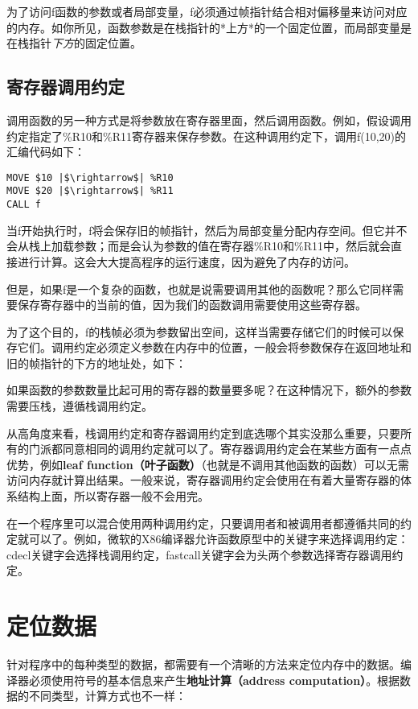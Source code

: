 \documentclass[cn,11pt,chinese]{elegantbook}
\begin{document}
为了访问f函数的参数或者局部变量，f必须通过帧指针结合相对偏移量来访问对应的内存。如你所见，函数参数是在栈指针的*上方*的一个固定位置，而局部变量是在栈指针\textit{下方}的固定位置。

\subsection{寄存器调用约定}

调用函数的另一种方式是将参数放在寄存器里面，然后调用函数。例如，假设调用约定指定了\%R10和\%R11寄存器来保存参数。在这种调用约定下，调用f(10,20)的汇编代码如下：

\begin{verbatim}
MOVE $10 |$\rightarrow$| %R10
MOVE $20 |$\rightarrow$| %R11
CALL f
\end{verbatim}

当f开始执行时，f将会保存旧的帧指针，然后为局部变量分配内存空间。但它并不会从栈上加载参数；而是会认为参数的值在寄存器\%R10和\%R11中，然后就会直接进行计算。这会大大提高程序的运行速度，因为避免了内存的访问。

但是，如果f是一个复杂的函数，也就是说需要调用其他的函数呢？那么它同样需要保存寄存器中的当前的值，因为我们的函数调用需要使用这些寄存器。

为了这个目的，f的栈帧必须为参数留出空间，这样当需要存储它们的时候可以保存它们。调用约定必须定义参数在内存中的位置，一般会将参数保存在返回地址和旧的帧指针的下方的地址处，如下：

如果函数的参数数量比起可用的寄存器的数量要多呢？在这种情况下，额外的参数需要压栈，遵循栈调用约定。

从高角度来看，栈调用约定和寄存器调用约定到底选哪个其实没那么重要，只要所有的门派都同意相同的调用约定就可以了。寄存器调用约定会在某些方面有一点点优势，例如\textbf{leaf function（叶子函数）}（也就是不调用其他函数的函数）可以无需访问内存就计算出结果。一般来说，寄存器调用约定会使用在有着大量寄存器的体系结构上面，所以寄存器一般不会用完。

在一个程序里可以混合使用两种调用约定，只要调用者和被调用者都遵循共同的约定就可以了。例如，微软的X86编译器允许函数原型中的关键字来选择调用约定：cdecl关键字会选择栈调用约定，fastcall关键字会为头两个参数选择寄存器调用约定。

\section{定位数据}

针对程序中的每种类型的数据，都需要有一个清晰的方法来定位内存中的数据。编译器必须使用符号的基本信息来产生\textbf{地址计算（address computation）}。根据数据的不同类型，计算方式也不一样：
\end{document}
